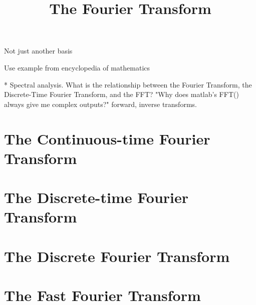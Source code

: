 

\title{The Fourier Transform}

\maketitle

Not just another basis

Use example from encyclopedia of mathematics


* Spectral analysis. What is the relationship between the Fourier
  Transform, the Discrete-Time Fourier Transform, and the FFT? "Why
  does matlab’s FFT() always give me complex outputs?" forward,
  inverse transforms.


\section{The Continuous-time Fourier Transform}


\section{The Discrete-time Fourier Transform}


\section{The Discrete Fourier Transform}


\section{The Fast Fourier Transform}



